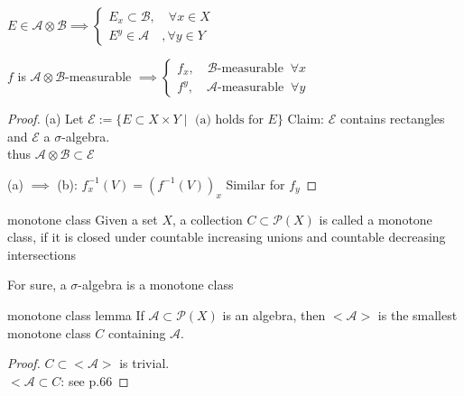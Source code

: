 \documentclass[lang=cn,11pt]{elegantbook}
\begin{document}
\begin{proposition}
    $E \in \mathcal{A} \otimes \mathcal{B} \implies \begin{cases}
        E_x \subset \mathcal{B},\quad \forall x \in X\\
        E^y \in \mathcal{A}\quad, \forall y \in Y
    \end{cases}$

    $f$ is $\mathcal{A} \otimes \mathcal{B}$-measurable $\implies \begin{cases}
        f_x, \quad \mathcal{B}\text{-measurable} \;\;\forall x \\
         f^y, \quad \mathcal{A}\text{-measurable} \;\;\forall y
    \end{cases}$ \\
\end{proposition}


\begin{proof}
    (a) Let $\mathcal{E}:= \{    E \subset X \times Y \mid \text{ (a) holds for } E  \}$
Claim: $\mathcal{E}$ contains rectangles and $\mathcal{E}$ a $\sigma$-algebra.\\
thus $\mathcal{A} \otimes \mathcal{B} \subset \mathcal{E}$

(a) $\implies$ (b): $f_x^{-1} (V) = (f^{-1}(V) )_x$
    Similar for $f_y$
\end{proof}





\begin{definition}{monotone class}
Given a set $X$, a collection $C \subset \mathcal{P}(X)$ is called a monotone class, if it is closed under countable increasing unions and countable decreasing intersections
\end{definition}
For sure, a $\sigma$-algebra is a monotone class


\begin{lemma}{monotone class lemma}
    If $\mathcal{A} \subset \mathcal{P}(X)$ is an algebra, then $<\mathcal{A>}$ is the smallest monotone class $C$ containing $\mathcal{A}$.
\end{lemma}
\begin{proof}
    $C \subset <\mathcal{A}>$ is trivial.\\
    $<\mathcal{A} \subset C$: see p.66
\end{proof}
\end{document}
